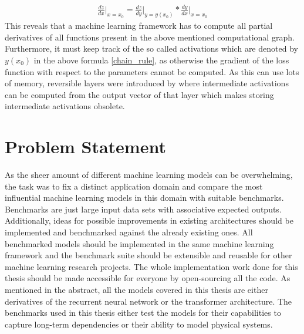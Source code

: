 \documentclass[draft,final]{vutinfth} %
\begin{document}
    \begin{align}
    \label{chain_rule}
    \frac{dz}{dx} \Bigr\rvert_{x=x_0} = \frac{dz}{dy} \Bigr\rvert_{y=y(x_0)} * \frac{dy}{dx} \Bigr\rvert_{x=x_0}
    \end{align}
    This reveals that a machine learning framework has to compute all partial derivatives of all functions present in the above mentioned computational graph.
    Furthermore, it must keep track of the so called activations which are denoted by $y(x_0)$ in the above formula \ref{chain_rule}, as otherwise the gradient of the loss function with respect to the parameters cannot be computed.
    As this can use lots of memory, reversible layers were introduced by \cite{ReversibleLayer} where intermediate activations can be computed from the output vector of that layer which makes storing intermediate activations obsolete.

    \section{Problem Statement}
    As the sheer amount of different machine learning models can be overwhelming, the task was to fix a distinct application domain and compare the most influential machine learning models in this domain with suitable benchmarks.
    Benchmarks are just large input data sets with associative expected outputs.
    Additionally, ideas for possible improvements in existing architectures should be implemented and benchmarked against the already existing ones.
    All benchmarked models should be implemented in the same machine learning framework and the benchmark suite should be extensible and reusable for other machine learning research projects.
    The whole implementation work done for this thesis should be made accessible for everyone by open-sourcing all the code.
    As mentioned in the abstract, all the models covered in this thesis are either derivatives of the recurrent neural network or the transformer \cite{Transformer} architecture.
    The benchmarks used in this thesis either test the models for their capabilities to capture long-term dependencies or their ability to model physical systems.
    
\end{document}
